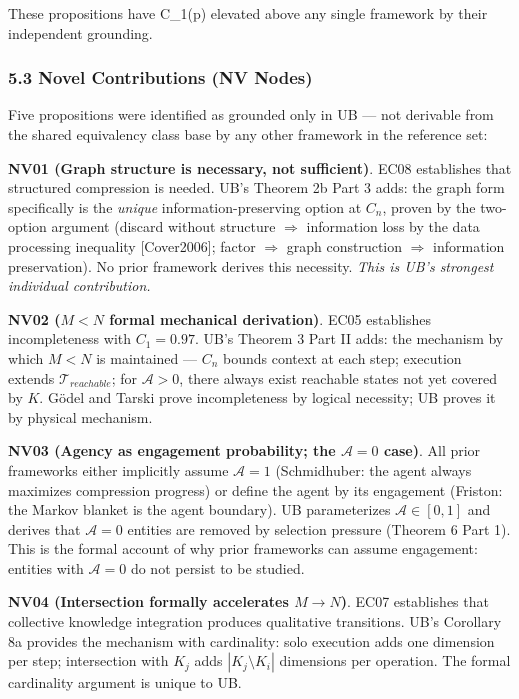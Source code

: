 \documentclass[
]{article}
\begin{document}
These propositions have C\_1(p) elevated above any single framework by
their independent grounding.

\subsubsection{5.3 Novel Contributions (NV
Nodes)}\label{novel-contributions-nv-nodes}

Five propositions were identified as grounded only in UB --- not
derivable from the shared equivalency class base by any other framework
in the reference set:

\textbf{NV01 (Graph structure is necessary, not sufficient)}. EC08
establishes that structured compression is needed. UB's Theorem 2b Part
3 adds: the graph form specifically is the \emph{unique}
information-preserving option at \(C_n\), proven by the two-option
argument (discard without structure \(\Rightarrow\) information loss by
the data processing inequality {[}Cover2006{]}; factor \(\Rightarrow\)
graph construction \(\Rightarrow\) information preservation). No prior
framework derives this necessity. \emph{This is UB's strongest
individual contribution.}

\textbf{NV02 (\(M < N\) formal mechanical derivation)}. EC05 establishes
incompleteness with \(C_1 = 0.97\). UB's Theorem 3 Part II adds: the
mechanism by which \(M < N\) is maintained --- \(C_n\) bounds context at
each step; execution extends \(\mathcal{T}_{reachable}\); for
\(\mathcal{A} > 0\), there always exist reachable states not yet covered
by \(K\). Gödel and Tarski prove incompleteness by logical necessity; UB
proves it by physical mechanism.

\textbf{NV03 (Agency as engagement probability; the \(\mathcal{A} = 0\)
case)}. All prior frameworks either implicitly assume
\(\mathcal{A} = 1\) (Schmidhuber: the agent always maximizes compression
progress) or define the agent by its engagement (Friston: the Markov
blanket is the agent boundary). UB parameterizes
\(\mathcal{A} \in [0,1]\) and derives that \(\mathcal{A} = 0\) entities
are removed by selection pressure (Theorem 6 Part 1). This is the formal
account of why prior frameworks can assume engagement: entities with
\(\mathcal{A} = 0\) do not persist to be studied.

\textbf{NV04 (Intersection formally accelerates \(M \to N\))}. EC07
establishes that collective knowledge integration produces qualitative
transitions. UB's Corollary 8a provides the mechanism with cardinality:
solo execution adds one dimension per step; intersection with \(K_j\)
adds \(|K_j \setminus K_i|\) dimensions per operation. The formal
cardinality argument is unique to UB.
\end{document}
